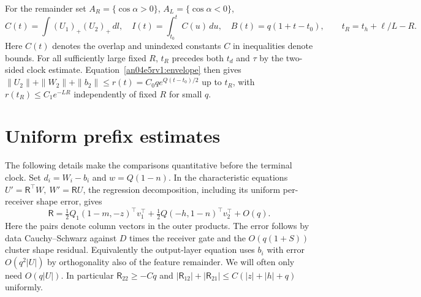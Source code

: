 \documentclass[11pt]{article}
\newcommand{\dd}{\,dl}
\begin{document}
For the remainder set $A_R=\{\cos\alpha>0\}$, $A_L=\{\cos\alpha<0\}$,
\[
 C(t)=\int (U_1)_+(U_2)_+\dd,\quad I(t)=\int_{t_0}^t C(u)\,du,\quad
 B(t)=q(1+t-t_0),\qquad t_R=t_h+\ell/L-R .
\]
Here $C(t)$ denotes the overlap and unindexed constants $C$ in inequalities denote bounds. For all sufficiently large fixed $R$, $t_R$ precedes both $t_d$ and $\tau$ by the two-sided clock estimate. Equation~\eqref{an04e5rv1:envelope} then gives $\|U_2\|+\|W_2\|+\|b_2\|\le r(t)=C_0q e^{Q(t-t_0)/2}$ up to $t_R$, with $r(t_R)\le C_1e^{-LR}$ independently of fixed $R$ for small $q$.

\section{Uniform prefix estimates}\label{an04e5rv1:prefixsec}
The following details make the comparisons quantitative before the
terminal clock. Set $d_i=W_i-b_i$ and $w=Q(1-n)$. In the characteristic
equations $U'=\mathsf R^\top W,\ W'=\mathsf R U$, the regression
decomposition, including its uniform per-receiver shape error, gives
\[
 \mathsf R=\tfrac12 Q_1(1-m,-z)^\top v_1^\top+
            \tfrac12 Q(-h,1-n)^\top v_2^\top+O(q).
\]
Here the pairs denote column vectors in the outer products. The error
follows by data Cauchy--Schwarz against $D$ times the receiver gate and
the $O(q(1+S))$ cluster shape residual. Equivalently the output-layer
equation uses $b_i$ with error $O(q^2|U|)$ by orthogonality also of the
feature remainder. We will often only need $O(q|U|)$.
In particular $\mathsf R_{22}\ge-Cq$ and
$|\mathsf R_{12}|+|\mathsf R_{21}|\le C(|z|+|h|+q)$ uniformly.
\end{document}

